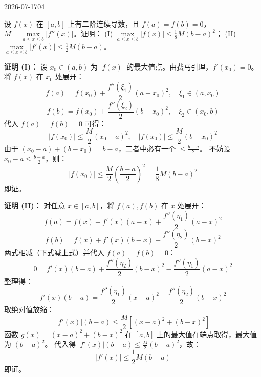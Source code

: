 \begin{mistake}{2026-07-17}{04}

\begin{problemcontent}
设 \(f(x)\) 在 \([a,b]\) 上有二阶连续导数，且 \(f(a) = f(b) = 0\)，\(M = \max\limits_{a \le x \le b} |f''(x)|\)。证明：
(I) \(\max\limits_{a \le x \le b} |f(x)| \le \frac{1}{8}M(b-a)^2\)；
(II) \(\max\limits_{a \le x \le b} |f'(x)| \le \frac{1}{2}M(b-a)\)。
\end{problemcontent}

\begin{solutioncontent}
\textbf{证明 (I)：}
设 \(x_0 \in (a, b)\) 为 \(|f(x)|\) 的最大值点。由费马引理，\(f'(x_0) = 0\)。
将 \(f(x)\) 在 \(x_0\) 处展开：
\[ f(a) = f(x_0) + \frac{f''(\xi_1)}{2}(a - x_0)^2, \quad \xi_1 \in (a, x_0) \]
\[ f(b) = f(x_0) + \frac{f''(\xi_2)}{2}(b - x_0)^2, \quad \xi_2 \in (x_0, b) \]
代入 \(f(a)=f(b)=0\) 可得：
\[ |f(x_0)| \le \frac{M}{2}(x_0 - a)^2, \quad |f(x_0)| \le \frac{M}{2}(b - x_0)^2 \]
由于 \((x_0 - a) + (b - x_0) = b - a\)，二者中必有一个 \(\le \frac{b-a}{2}\)。
不妨设 \(x_0 - a \le \frac{b-a}{2}\)，则：
\[ |f(x_0)| \le \frac{M}{2} \left(\frac{b-a}{2}\right)^2 = \frac{1}{8}M(b-a)^2 \]
即证。

\textbf{证明 (II)：}
对任意 \(x \in [a, b]\)，将 \(f(a), f(b)\) 在 \(x\) 处展开：
\[ f(a) = f(x) + f'(x)(a - x) + \frac{f''(\eta_1)}{2}(a - x)^2 \]
\[ f(b) = f(x) + f'(x)(b - x) + \frac{f''(\eta_2)}{2}(b - x)^2 \]
两式相减（下式减上式）并代入 \(f(a)=f(b)=0\)：
\[ 0 = f'(x)(b - a) + \frac{f''(\eta_2)}{2}(b - x)^2 - \frac{f''(\eta_1)}{2}(a - x)^2 \]
整理得：
\[ f'(x)(b - a) = \frac{f''(\eta_1)}{2}(x - a)^2 - \frac{f''(\eta_2)}{2}(b - x)^2 \]
取绝对值放缩：
\[ |f'(x)|(b - a) \le \frac{M}{2} \left[ (x - a)^2 + (b - x)^2 \right] \]
函数 \(g(x) = (x - a)^2 + (b - x)^2\) 在 \([a,b]\) 上的最大值在端点取得，最大值为 \((b-a)^2\)。
代入得 \(|f'(x)|(b-a) \le \frac{M}{2}(b-a)^2\)，故：
\[ |f'(x)| \le \frac{1}{2}M(b-a) \]
即证。
\end{solutioncontent}


\end{mistake}
